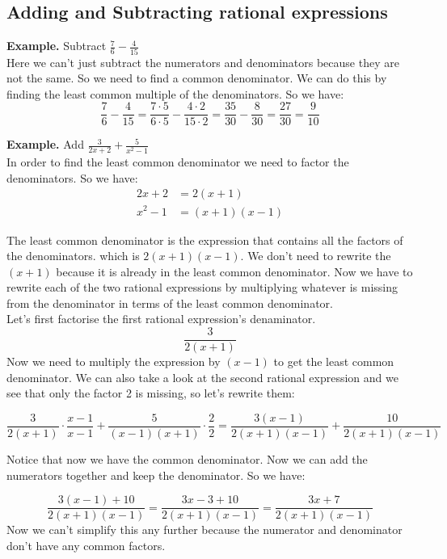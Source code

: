 \subsection{Adding and Subtracting rational expressions}

\textbf{Example.} Subtract $\displaystyle \frac{7}{6} - \frac{4}{15}$ \\
Here we can't just subtract the numerators and denominators because they are not the same. So we need to find a common denominator. We can do this by finding the least common multiple of the denominators. So we have:
$$ \frac{7}{6} - \frac{4}{15} = \frac{7 \cdot 5}{6 \cdot 5} - \frac{4 \cdot 2}{15 \cdot 2} = \frac{35}{30} - \frac{8}{30} = \frac{27}{30} = \frac{9}{10}$$

\textbf{Example.} Add $\displaystyle \frac{3}{2x+2} + \frac{5}{x^2-1}$ \\
In order to find the least common denominator we need to factor the denominators. So we have:
\begin{align}
    2x+2 &= 2(x+1) \\
    x^2-1 &= (x+1)(x-1)
\end{align}

The least common denominator is the expression that contains all the factors of the denominators. which is $2(x+1)(x-1)$. We don't need to rewrite the $(x+1)$ because it is already in the least common denominator. 
Now we have to rewrite each of the two rational expressions by multiplying whatever is missing from the denominator in terms of the least common denominator. \\

Let's first factorise the first rational expression's denaminator. 
$$ \frac{3}{2(x+1)} $$
Now we need to multiply the expression by $(x-1)$ to get the least common denominator. We can also take a look at the second rational expression and we see that only the factor 2 is missing, so let's rewrite them:

$$ \frac{3}{2(x+1)} \cdot \frac{x-1}{x-1} + \frac{5}{(x-1)(x+1)} \cdot \frac{2}{2} = \frac{3(x-1)}{2(x+1)(x-1)} + \frac{10}{2(x+1)(x-1)} $$

Notice that now we have the common denominator. Now we can add the numerators together and keep the denominator. So we have:

$$ \frac{3(x-1)+10}{2(x+1)(x-1)} = \frac{3x-3+10}{2(x+1)(x-1)} = \frac{3x+7}{2(x+1)(x-1)} $$
Now we can't simplify this any further because the numerator and denominator don't have any common factors.